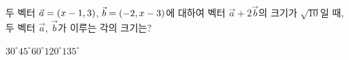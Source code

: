 두 벡터 $\vec{a}=(x-1{,}\mkern3mu\mathopen{}3)$, $\vec{b}=(-2{,}\mkern3mu\mathopen{}x-3)$에 대하여 벡터 $\vec{a}+2\vec{b}$의 크기가 $\sqrt{10}$일 때, 두 벡터 $\vec{a}$, $\vec{b}$가 이루는 각의 크기는? 
\begin{choices32}{$30^\circ$}{$45^\circ$}{$60^\circ$}{$120^\circ$}{$135^\circ$}\end{choices32}
